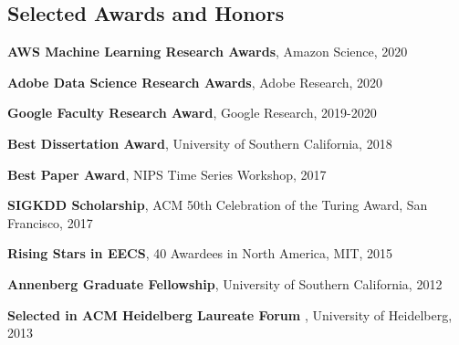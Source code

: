 \documentclass[margin,line]{res}
\newenvironment{list1}{
  \begin{list}{\ding{113}}{%
      \setlength{\itemsep}{0in}
      \setlength{\parsep}{0in} \setlength{\parskip}{0in}
      \setlength{\topsep}{0in} \setlength{\partopsep}{0in} 
      \setlength{\leftmargin}{0.17in}}}{\end{list}}
\begin{document}
\begin{resume}


\section{\sc Selected Awards and Honors} 

\textbf{AWS Machine Learning Research Awards},  Amazon Science, 2020

\textbf{Adobe Data Science Research Awards},  Adobe Research, 2020

\textbf{Google Faculty Research  Award},  Google Research, 2019-2020



\textbf{Best Dissertation Award}, University of Southern California, 2018

\textbf{Best Paper Award},  NIPS Time Series Workshop, 2017

\textbf{SIGKDD Scholarship},  ACM 50th Celebration of the Turing Award, San Francisco, 2017

\textbf{Rising Stars in EECS},  40 Awardees in North America, MIT, 2015

\textbf{Annenberg Graduate Fellowship}, University of Southern California, 2012







%

\textbf{Selected in ACM Heidelberg Laureate Forum }, University of Heidelberg, 2013



\end{resume}
\end{document}
